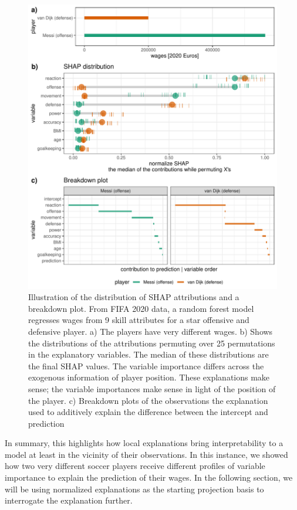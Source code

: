 \documentclass[
]{article}
\begin{document}
\begin{figure}

{\centering \includegraphics[width=29.17in]{./figures/shap_distr_bd} 

}

\caption{Illustration of the distribution of SHAP attributions and a breakdown plot. From FIFA 2020 data, a random forest model regresses wages from 9 skill attributes for a star offensive and defensive player. a) The players have very different wages. b) Shows the distributions of the attributions permuting over 25 permutations in the explanatory variables. The median of these distributions are the final SHAP values. The variable importance differs across the exogenous information of player position. These explanations make sense; the variable importances make sense in light of the position of the player. c) Breakdown plots of the observations the explanation used to additively explain the difference between the intercept and prediction}\label{fig:shapdistrbd}
\end{figure}

In summary, this highlights how local explanations bring interpretability to a model at least in the vicinity of their observations. In this instance, we showed how two very different soccer players receive different profiles of variable importance to explain the prediction of their wages. In the following section, we will be using normalized explanations as the starting projection basis to interrogate the explanation further.
\end{document}
